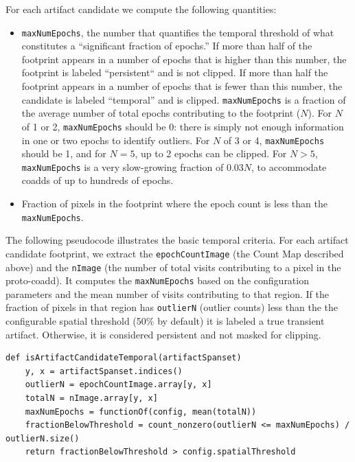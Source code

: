\documentclass[DM,authoryear,toc]{lsstdoc}
\begin{document}
For each artifact candidate we compute the following quantities:
\begin{itemize}
\item \texttt{maxNumEpochs}, the number that quantifies the temporal threshold of what constitutes a ``significant fraction of epochs.''
If more than half of the footprint appears in a number of epochs that is higher than this number, the footprint is labeled ``persistent`` and is not clipped.
 If more than half the footprint appears in a number of epochs that is fewer than this number, the candidate is labeled ``temporal'' and is clipped.
 \texttt{maxNumEpochs} is a fraction of the average number of total epochs contributing to the footprint ($N$). For $N$ of 1 or 2, \texttt{maxNumEpochs} should be 0:  there is simply not enough information in one or two epochs to identify outliers.
For $N$ of 3 or 4, \texttt{maxNumEpochs} should be 1, and for $N=5$, up to 2 epochs can be clipped. For $N>5$,  \texttt{maxNumEpochs} is a very slow-growing fraction of $0.03N$, to accommodate coadds of up to hundreds of epochs.
\item  Fraction of pixels in the footprint where the epoch count is less than the \texttt{maxNumEpochs}.
\end{itemize}

The following pseudocode illustrates the basic temporal criteria.
For each artifact candidate footprint, we extract the \texttt{epochCountImage} (the Count Map described above) and the \texttt{nImage} (the number of total visits contributing to a pixel in the proto-coadd).
It computes the \texttt{maxNumEpochs} based on the configuration parameters and the mean number of visits contributing to that region.
If the fraction of pixels in that region has \texttt{outlierN} (outlier counts) less than the the configurable spatial threshold (50\% by default) it is labeled a true transient artifact.
Otherwise, it is considered persistent and not masked for clipping.

\begin{verbatim}
def isArtifactCandidateTemporal(artifactSpanset)
    y, x = artifactSpanset.indices()
    outlierN = epochCountImage.array[y, x]
    totalN = nImage.array[y, x]
    maxNumEpochs = functionOf(config, mean(totalN))
    fractionBelowThreshold = count_nonzero(outlierN <= maxNumEpochs) / outlierN.size()
    return fractionBelowThreshold > config.spatialThreshold
\end{verbatim}
\end{document}
